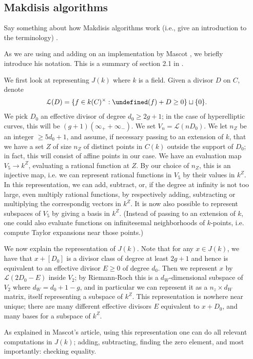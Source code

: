 \documentclass[12pt]{article}
\newcommand{\Lcal}{\mathcal{L}}
\let\div\undefined
\DeclareMathOperator{\div}{div}
\theoremstyle{plain}
\theoremstyle{definition}
\theoremstyle{remark}
\begin{document}
\subsection{Makdisis algorithms}
Say something about how Makdisis algorithms work (i.e., give an introduction to the terminology) \cite{makdisi2004}.

As we are using and adding on an implementation by Mascot \cite{mascot2018}, we briefly introduce his notation. This is a summary of section 2.1 in \cite{mascot2018}.

We first look at representing $J(k)$ where $k$ is a field. Given a divisor $D$ on $C$, denote
\[
\Lcal(D) = \{f \in k(C)^\times : \div(f) + D \geq 0 \} \sqcup \{0\}.
\]
We pick $D_0$ an effective divisor of degree $d_0 \geq 2g+1$; in the case of hyperelliptic curves, this will be $(g+1)(\infty_+ + \infty_-)$. We set $V_n = \Lcal(nD_0)$. We let $n_Z$ be an integer $\geq 5d_0 + 1$, and assume, if necessary passing to an extension of $k$, that we have a set $Z$ of size $n_Z$ of distinct points in $C(k)$ outside the support of $D_0$; in fact, this will consist of affine points in our case. We have an evaluation map $V_5 \to k^Z$, evaluating a rational function at $Z$. By our choice of $n_Z$, this is an injective map, i.e. we can represent rational functions in $V_5$ by their values in $k^Z$. In this representation, we can add, subtract, or, if the degree at infinity is not too large, even multiply rational functions, by respectively adding, subtracting or multiplying the correspondig vectors in $k^Z$. It is now also possible to represent subspaces of $V_5$ by giving a basis in $k^Z$. (Instead of passing to an extension of $k$, one could also evaluate functions on infinitesemal neighborhoods of $k$-points, i.e. compute Taylor expansions near those points.)

We now explain the representation of $J(k)$. Note that for any $x \in J(k)$, we have that $x + [D_0]$ is a divisor class of degree at least $2g+1$ and hence is equivalent to an effective divisor $E \geq 0$ of degree $d_0$. Then we represent $x$ by $\Lcal(2D_0 - E)$ inside $V_2$; by Riemann-Roch this is a $d_W$-dimensional subspace of $V_2$ where $d_W = d_0 + 1 - g$, and in particular we can represent it as a $n_z \times d_W$ matrix, itself representing a subspace of $k^Z$. This representation is nowhere near unique; there are many different effective divisors $E$ equivalent to $x + D_0$, and many bases for a subspace of $k^Z$.

As explained in Mascot's article, using this representation one can do all relevant computations in $J(k)$; adding, subtracting, finding the zero element, and most importantly: checking equality.
\end{document}
